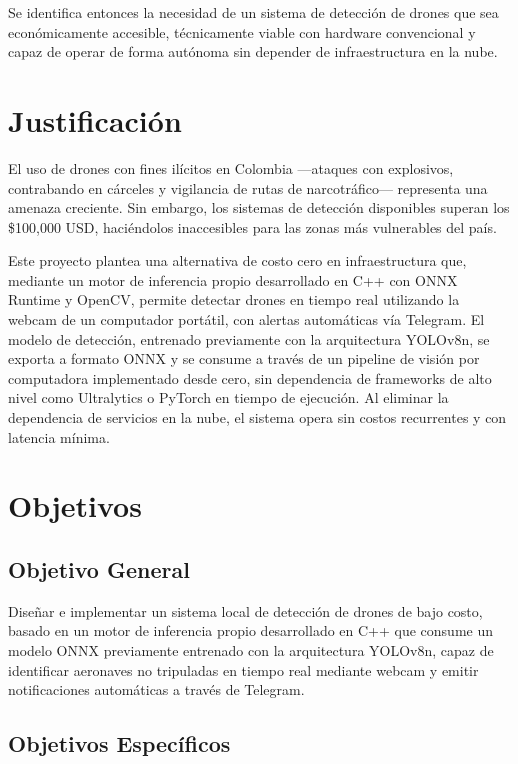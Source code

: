 \documentclass[sigconf,nonacm]{acmart}
\begin{document}
Se identifica entonces la necesidad de un sistema de detección de drones que sea económicamente accesible, técnicamente viable con hardware convencional y capaz de operar de forma autónoma sin depender de infraestructura en la nube.


\section{Justificación}


El uso de drones con fines ilícitos en Colombia ---ataques con explosivos, contrabando en cárceles y vigilancia de rutas de narcotráfico--- representa una amenaza creciente. Sin embargo, los sistemas de detección disponibles superan los \$100,000 USD, haciéndolos inaccesibles para las zonas más vulnerables del país.

Este proyecto plantea una alternativa de costo cero en infraestructura que, mediante un motor de inferencia propio desarrollado en C++ con ONNX Runtime y OpenCV, permite detectar drones en tiempo real utilizando la webcam de un computador portátil, con alertas automáticas vía Telegram. El modelo de detección, entrenado previamente con la arquitectura YOLOv8n, se exporta a formato ONNX y se consume a través de un pipeline de visión por computadora implementado desde cero, sin dependencia de frameworks de alto nivel como Ultralytics o PyTorch en tiempo de ejecución. Al eliminar la dependencia de servicios en la nube, el sistema opera sin costos recurrentes y con latencia mínima.


\section{Objetivos}


\subsection{Objetivo General}


Diseñar e implementar un sistema local de detección de drones de bajo costo, basado en un motor de inferencia propio desarrollado en C++ que consume un modelo ONNX previamente entrenado con la arquitectura YOLOv8n, capaz de identificar aeronaves no tripuladas en tiempo real mediante webcam y emitir notificaciones automáticas a través de Telegram.


\subsection{Objetivos Específicos}
\end{document}

